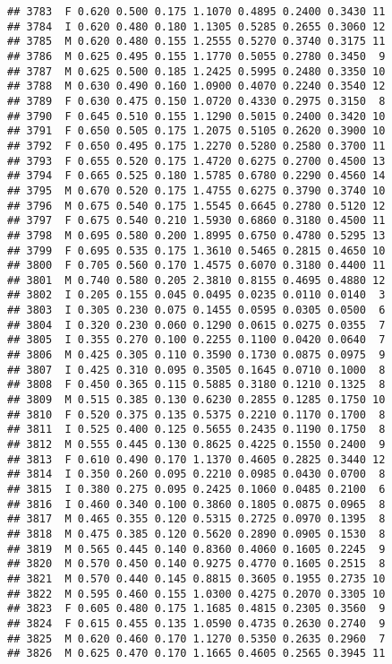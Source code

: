 \documentclass[
]{article}
\begin{document}
\begin{verbatim}
## 3783  F 0.620 0.500 0.175 1.1070 0.4895 0.2400 0.3430 11
## 3784  I 0.620 0.480 0.180 1.1305 0.5285 0.2655 0.3060 12
## 3785  M 0.620 0.480 0.155 1.2555 0.5270 0.3740 0.3175 11
## 3786  M 0.625 0.495 0.155 1.1770 0.5055 0.2780 0.3450  9
## 3787  M 0.625 0.500 0.185 1.2425 0.5995 0.2480 0.3350 10
## 3788  M 0.630 0.490 0.160 1.0900 0.4070 0.2240 0.3540 12
## 3789  F 0.630 0.475 0.150 1.0720 0.4330 0.2975 0.3150  8
## 3790  F 0.645 0.510 0.155 1.1290 0.5015 0.2400 0.3420 10
## 3791  F 0.650 0.505 0.175 1.2075 0.5105 0.2620 0.3900 10
## 3792  F 0.650 0.495 0.175 1.2270 0.5280 0.2580 0.3700 11
## 3793  F 0.655 0.520 0.175 1.4720 0.6275 0.2700 0.4500 13
## 3794  F 0.665 0.525 0.180 1.5785 0.6780 0.2290 0.4560 14
## 3795  M 0.670 0.520 0.175 1.4755 0.6275 0.3790 0.3740 10
## 3796  M 0.675 0.540 0.175 1.5545 0.6645 0.2780 0.5120 12
## 3797  F 0.675 0.540 0.210 1.5930 0.6860 0.3180 0.4500 11
## 3798  M 0.695 0.580 0.200 1.8995 0.6750 0.4780 0.5295 13
## 3799  F 0.695 0.535 0.175 1.3610 0.5465 0.2815 0.4650 10
## 3800  F 0.705 0.560 0.170 1.4575 0.6070 0.3180 0.4400 11
## 3801  M 0.740 0.580 0.205 2.3810 0.8155 0.4695 0.4880 12
## 3802  I 0.205 0.155 0.045 0.0495 0.0235 0.0110 0.0140  3
## 3803  I 0.305 0.230 0.075 0.1455 0.0595 0.0305 0.0500  6
## 3804  I 0.320 0.230 0.060 0.1290 0.0615 0.0275 0.0355  7
## 3805  I 0.355 0.270 0.100 0.2255 0.1100 0.0420 0.0640  7
## 3806  M 0.425 0.305 0.110 0.3590 0.1730 0.0875 0.0975  9
## 3807  I 0.425 0.310 0.095 0.3505 0.1645 0.0710 0.1000  8
## 3808  F 0.450 0.365 0.115 0.5885 0.3180 0.1210 0.1325  8
## 3809  M 0.515 0.385 0.130 0.6230 0.2855 0.1285 0.1750 10
## 3810  F 0.520 0.375 0.135 0.5375 0.2210 0.1170 0.1700  8
## 3811  I 0.525 0.400 0.125 0.5655 0.2435 0.1190 0.1750  8
## 3812  M 0.555 0.445 0.130 0.8625 0.4225 0.1550 0.2400  9
## 3813  F 0.610 0.490 0.170 1.1370 0.4605 0.2825 0.3440 12
## 3814  I 0.350 0.260 0.095 0.2210 0.0985 0.0430 0.0700  8
## 3815  I 0.380 0.275 0.095 0.2425 0.1060 0.0485 0.2100  6
## 3816  I 0.460 0.340 0.100 0.3860 0.1805 0.0875 0.0965  8
## 3817  M 0.465 0.355 0.120 0.5315 0.2725 0.0970 0.1395  8
## 3818  M 0.475 0.385 0.120 0.5620 0.2890 0.0905 0.1530  8
## 3819  M 0.565 0.445 0.140 0.8360 0.4060 0.1605 0.2245  9
## 3820  M 0.570 0.450 0.140 0.9275 0.4770 0.1605 0.2515  8
## 3821  M 0.570 0.440 0.145 0.8815 0.3605 0.1955 0.2735 10
## 3822  M 0.595 0.460 0.155 1.0300 0.4275 0.2070 0.3305 10
## 3823  F 0.605 0.480 0.175 1.1685 0.4815 0.2305 0.3560  9
## 3824  F 0.615 0.455 0.135 1.0590 0.4735 0.2630 0.2740  9
## 3825  M 0.620 0.460 0.170 1.1270 0.5350 0.2635 0.2960  7
## 3826  M 0.625 0.470 0.170 1.1665 0.4605 0.2565 0.3945 11

\end{verbatim}
\end{document}
